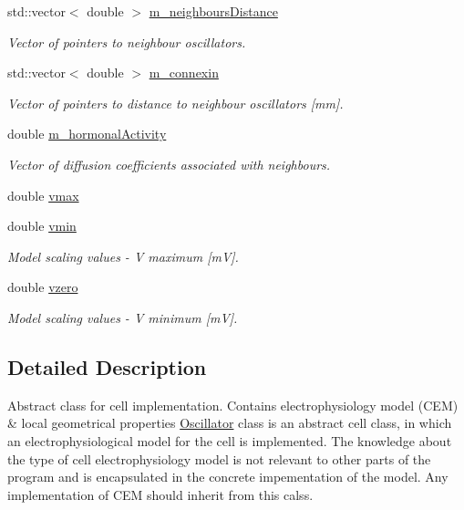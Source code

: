 \begin{DoxyCompactItemize}
\item 
std\+::vector$<$ double $>$ \hyperlink{class_oscillator_a7031173912bc2225997a3ab6f9995fec}{m\+\_\+neighbours\+Distance}
\begin{DoxyCompactList}\small\item\em Vector of pointers to neighbour oscillators. \end{DoxyCompactList}\item 
std\+::vector$<$ double $>$ \hyperlink{class_oscillator_a94d86971a2a425d2e2492962491dc01b}{m\+\_\+connexin}
\begin{DoxyCompactList}\small\item\em Vector of pointers to distance to neighbour oscillators \mbox{[}mm\mbox{]}. \end{DoxyCompactList}\item 
double \hyperlink{class_oscillator_a80a2b0beda0d17f549160fbbd456243b}{m\+\_\+hormonal\+Activity}
\begin{DoxyCompactList}\small\item\em Vector of diffusion coefficients associated with neighbours. \end{DoxyCompactList}\item 
double \hyperlink{class_oscillator_a43006eaf9a5a3b50a8f6a2a95ce47231}{vmax}
\item 
double \hyperlink{class_oscillator_a8912b5faff383dcc1a33554d2bcc5844}{vmin}
\begin{DoxyCompactList}\small\item\em Model scaling values -\/ V maximum \mbox{[}m\+V\mbox{]}. \end{DoxyCompactList}\item 
double \hyperlink{class_oscillator_af6886099dfca8ec732676f4f89935651}{vzero}
\begin{DoxyCompactList}\small\item\em Model scaling values -\/ V minimum \mbox{[}m\+V\mbox{]}. \end{DoxyCompactList}\end{DoxyCompactItemize}


\subsection{Detailed Description}
Abstract class for cell implementation. Contains electrophysiology model (C\+E\+M) \& local geometrical properties \hyperlink{class_oscillator}{Oscillator} class is an abstract cell class, in which an electrophysiological model for the cell is implemented. The knowledge about the type of cell electrophysiology model is not relevant to other parts of the program and is encapsulated in the concrete impementation of the model. Any implementation of C\+E\+M should inherit from this calss. 

